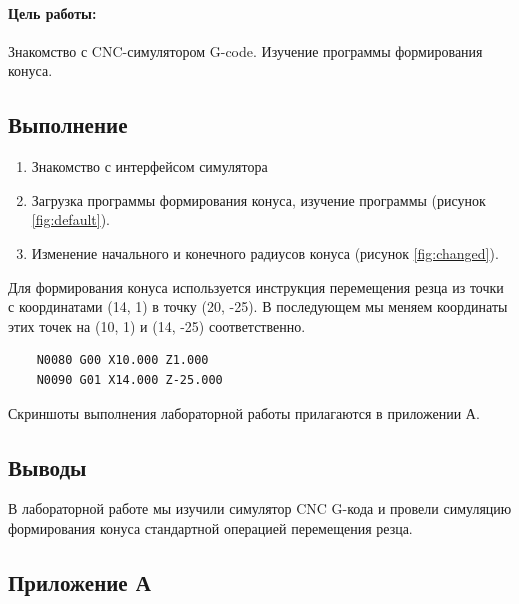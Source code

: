 \paragraph{Цель работы:} Знакомство с CNC-симулятором G-code. Изучение программы формирования конуса.

\subsection*{Выполнение}

\begin{enumerate}
    \item Знакомство с интерфейсом симулятора
    \item Загрузка программы формирования конуса, изучение программы (рисунок \ref{fig:default}).
    \item Изменение начального и конечного радиусов конуса (рисунок \ref{fig:changed}).
\end{enumerate}

Для формирования конуса используется инструкция перемещения резца из точки с координатами (14, 1) в точку (20, -25). В последующем мы меняем координаты этих точек на (10, 1) и (14, -25) соответственно.

\begin{verbatim}
    N0080 G00 X10.000 Z1.000
    N0090 G01 X14.000 Z-25.000
\end{verbatim}

Скриншоты выполнения лабораторной работы прилагаются в приложении А.

\subsection*{Выводы}

В лабораторной работе мы изучили симулятор CNC G-кода и провели симуляцию формирования конуса стандартной операцией перемещения резца.

\clearpage

\subsection*{Приложение А}


